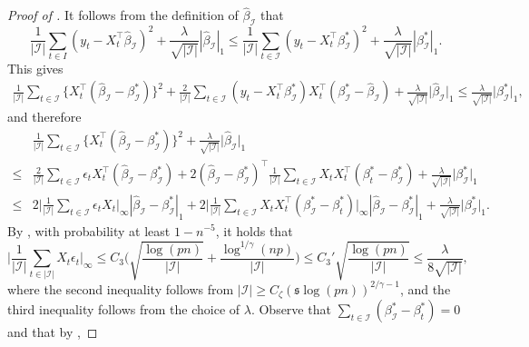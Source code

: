 \documentclass[11pt]{article}
\newcommand{\I}{{\mathcal I }}
\newcommand{\s}{ { \mathfrak{s}  } }
\theoremstyle{plain}
\theoremstyle{definition}
\begin{document}
\begin{proof}[Proof of ]   It follows from the definition of $\widehat{\beta}_\I$ that 
	\[
	 \frac{1}{|\I | }	\sum_{  t  \in I} (y_ t  - X_t ^{\top}\widehat{\beta}_\I )^2 + \frac{ \lambda}{ \sqrt{  |\I|  }}     |\widehat{\beta} _\I |_1 \leq  
	 \frac{1}{|\I | } \sum_{t \in \I} (y_t  - X_t ^{\top}\beta^*_\I )^2 + \frac{ \lambda}{ \sqrt{  |\I|  }}   |\beta^*_\I   |_1.
	\]
	This gives 
	\begin{align*}
		 \frac{1}{|\I | } \sum_{t  \in \I} \bigl\{X_t  ^{\top}(\widehat{\beta}_\I - \beta^*_\I )\bigr\}^2 +    \frac{ 2 }{|\I | }   \sum_{t  \in \I}(y_t  - X_t ^{\top}\beta^*_\I)X_t ^{\top}(\beta^*_\I  - \widehat{\beta}_\I )  +  \frac{ \lambda}{ \sqrt{  |\I|  }}   \bigl |\widehat{\beta}_\I \bigr |_1 
		\leq  \frac{ \lambda}{ \sqrt{  |\I|  }}    \bigl |\beta^*_\I \bigr |_1,
	\end{align*}
	and therefore
	\begin{align}
		& \frac{1}{|\I | }	  \sum_{ t   \in \I} \bigl\{X_t  ^{\top}(\widehat{\beta} _\I  - \beta^*_\I )\bigr\}^2 + \frac{ \lambda}{ \sqrt{  |\I|  }} \bigl |\widehat{\beta}_\I \bigr |_1  \nonumber \\
		\nonumber
		 \leq  &  \frac{ 2}{|\I | }	 \sum_{ t  \in  \I } \epsilon_t   X_t  ^{\top}(\widehat{\beta}_\I  - \beta^*_\I ) 
+ 2   (\widehat{\beta}_\I  - \beta^*_\I )^{\top}\frac{  1 }{|\I | }	 \sum_{t \in   \I} X_ t   X_t ^{\top}(    \beta^*_t  -\beta^*_\I   )		 
		+  \frac{ \lambda}{ \sqrt{  |\I|  }}    \bigl |\beta^*_\I \bigr |_1  
		\\
		\le &  2 \bigg  | \frac{1}{|\I| }\sum_{t\in \I }  \epsilon_t X_t \bigg |_\infty  | \widehat \beta_\I -\beta^*_\I | _1  + 2 \bigg|  \frac{1}{|\I| }\sum_{ t   \in \I} X_ t  X_t  ^\top (\beta^*  _\I  -\beta^*_t  )   \bigg|_\infty | \widehat \beta_\I -\beta^*_\I | _1 +  \frac{ \lambda}{ \sqrt{  |\I|  }}    \bigl |\beta^*_\I \bigr |_1   
		 .	 \label{eq-lem10-pf-2}
	\end{align}
	By , with probability at least  $1-n^{-5}$, it holds that 
	$$ \bigg | \frac{1}{|\I | }\sum_{t\in |\I | }  X_{t } \epsilon_t  \bigg |_\infty  \le  C _3 \bigg (   \sqrt { \frac{\log(pn) }{|\I| }  }  +   \frac{ \log^{1/\gamma }(np) }{|\I| }  \bigg)  \le C_3' \sqrt { \frac{\log(pn) }{|\I| }  }  \le \frac{\lambda }{ 8 \sqrt {|\I| }} ,$$
	where the  second   inequality follows from 
	$| \mathcal I | \ge  C_{\zeta}   (\s \log(pn)) ^{2/ \gamma  - 1}  $, and the third  inequality follows from the choice of $\lambda$. 
Observe that $\sum_{t\in \I} (\beta^*_\I  - \beta^*_t )=0 $  and that by ,

\end{proof}
\end{document}
